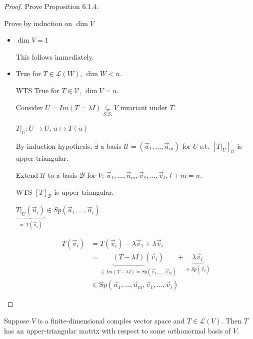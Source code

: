 \documentclass[11pt,fleqn]{book} %
\begin{document}
\begin{proof} Prove Proposition 6.1.4.

    Prove by induction on $\dim V$

    \begin{itemize}
        \item $\dim V = 1$

        This follows immediately.

        \item True for $T \in \mathcal{L}(W)$, $\dim W < n$.

        WTS True for $T \in \mathcal{V}$, $\dim V = n$.

        Consider $U = Im(T = \lambda I) \underset{S.S.}{\subsetneq} V$ invariant under $T$.

        $T\bigg|_U: U \to U$, $u \mapsto T(u)$

        By induction hypothesis, $\exists$ a basis $\mathcal{U} = (\vec{u}_1, \dots, \vec{u}_m)$ for $U$ s.t. $[T\bigg|_U]_\mathcal{U}$ is upper triangular.

        Extend $\mathcal{U}$ to a basis $\mathcal{B}$ for $V$: $\vec{u}_1, \dots, \vec{u}_m, \vec{v}_1, \dots, \vec{v}_l$, $l + m = n$.

        WTS $[T]_\mathcal{B}$ is upper triangular.

        $\underbrace{T\bigg|_U(\vec{u}_i)}_{=~T(\vec{u}_i)} \in Sp(\vec{u}_1, \dots, \vec{u}_i)$

        \begin{align*}
            T(\vec{v}_i)
            &= T(\vec{v}_i) - \lambda\vec{v}_1 + \lambda\vec{v}_i
            \\
            &= \underbrace{(T - \lambda I)(\vec{v}_i)}_{\in Im(T - \lambda I) = Sp(\vec{v}_1, \dots, \vec{v}_m)} + \underbrace{\lambda \vec{v} _i}_{\in Sp(\vec{v}_i)}
            \\
            &\in \mathrm{Sp}(\vec{u}_1, \dots, \vec{u}_m, \vec{v}_1, \dots, \vec{v}_i)
        \end{align*}
    \end{itemize}
\end{proof}

\setcounter{section}{0}
\setcounter{dummy}{1}
\begin{theorem}
    Suppose $V$ is a finite-dimensional comples vector space and $T \in \mathcal{L}(V)$. Then $T$ has an upper-triangular matrix with respect to some orthonormal basis of $V$.
\end{theorem}
\setcounter{section}{1}
\end{document}
